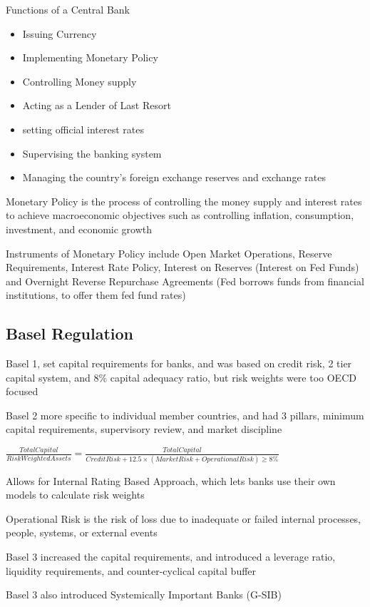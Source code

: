 Functions of a Central Bank
\begin{itemize}
    \item Issuing Currency
    \item Implementing Monetary Policy
    \item Controlling Money supply
    \item Acting as a Lender of Last Resort
    \item setting official interest rates
    \item Supervising the banking system
    \item Managing the country's foreign exchange reserves and exchange rates
\end{itemize}

Monetary Policy is the process of controlling the money supply and interest rates to achieve macroeconomic objectives such as controlling inflation, consumption, investment, and economic growth

Instruments of Monetary Policy include Open Market Operations, Reserve Requirements, Interest Rate Policy, Interest on Reserves (Interest on Fed Funds) and Overnight Reverse Repurchase Agreements (Fed borrows funds from financial institutions, to offer them fed fund rates)

\subsection{Basel Regulation}
Basel 1, set capital requirements for banks, and was based on credit risk, 2 tier capital system, and 8\% capital adequacy ratio, but 
risk weights were too OECD focused

Basel 2 more specific to individual member countries, and had 3 pillars, minimum capital requirements, supervisory review, and market discipline

$\frac{Total Capital}{Risk Weighted Assets} = \frac{Total Capital}{Credit Risk + 12.5 \times (Market Risk + Operational Risk) \geq 8\%}$

Allows for Internal Rating Based Approach, which lets banks use their own models to calculate risk weights

Operational Risk is the risk of loss due to inadequate or failed internal processes, people, systems, or external events

Basel 3 increased the capital requirements, and introduced a leverage ratio, liquidity requirements, and counter-cyclical capital buffer

Basel 3 also introduced Systemically Important Banks (G-SIB)

